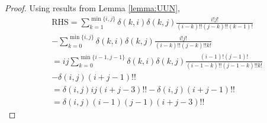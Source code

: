 \documentclass[conference]{IEEEtran}
\begin{document}
\begin{proof}
    Using results from Lemma \ref{lemma:UUN},
    \begin{align*}
        & \textrm{RHS}  = \sum_{k=1}^{\min\{i, j\}}
        \delta(k, i) \delta(k, j) \frac{i!j!}{(i-k)!!(j-k)!!(k-1)!}\\
        & -\sum_{k=0}^{\min\{i, j\}}
        \delta(k, i) \delta(k, j) \frac{i!j!}{(i-k)!!(j-k)!!k!}  \\
        & =  ij\sum_{k=0}^{\min\{i-1, j-1\}}
        \delta(k, i) \delta(k, j) \frac{(i-1)!(j-1)!}{(i-1-k)!!(j-1-k)!!k!} \\
        & -\delta(i, j)(i+j-1)!! \\
        & = \delta(i, j)ij(i+j-3)!! - \delta(i, j)(i+j-1)!! \\
        & = \delta(i, j)(i-1)(j-1)(i+j-3)!!
    \end{align*}
\end{proof}
\end{document}

